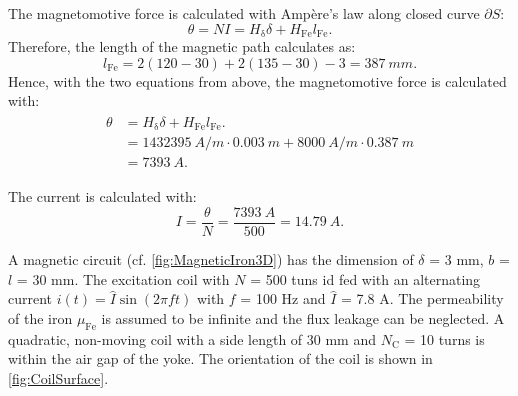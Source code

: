 \begin{solutionblock}

    The magnetomotive force is calculated with Ampère's law along closed curve $\partial S$:
    \begin{equation}
        \theta = N I
        = H_{\updelta} \delta + H_{\mathrm{Fe}} l_{\mathrm{Fe}}.
    \end{equation}
    Therefore, the length of the magnetic path calculates as:
    \begin{equation}
        l_{\mathrm{Fe}} = 2(120-30) + 2(135-30)-3 = 387 \ \si{mm}.
    \end{equation}
    Hence, with the two equations from above, the magnetomotive force is calculated with:
    \begin{align}
        \begin{split}
            \theta &= H_{\updelta} \delta + H_{\mathrm{Fe}} l_{\mathrm{Fe}}.\\
            &= 1432395 \ \si{A/m} \cdot 0.003 \ \si{m} + 8000 \ \si{A/m} \cdot 0.387 \ \si{m} \\
            &= 7393 \ \si{A}.
        \end{split}
    \end{align}

\end{solutionblock}




\begin{solutionblock}
    The current is calculated with:
    \begin{equation}
        I = \frac{\theta}{N} = \frac{7393 \ \si{A}}{500} = 14.79 \ \si{A}.
    \end{equation}

\end{solutionblock}








A magnetic circuit (cf. \autoref{fig:MagneticIron3D}) has the dimension of $\delta$ = 3 mm, $b$ = $l$ = 30 mm. The excitation coil with $N$ = 500 tuns id fed with an alternating current $i(t) = \hat{I} \sin(2\pi f t)$ with $f$ = 100 Hz and $\hat{I}$ = 7.8 A.
The permeability of the iron $\mu_{\mathrm{Fe}}$ is assumed to be infinite and the flux leakage can be neglected.
A quadratic, non-moving coil with a side length of 30 mm and $N_{\mathrm{C}}$ = 10 turns is within the air gap of the yoke. The orientation of the coil is shown in \autoref{fig:CoilSurface}. 

